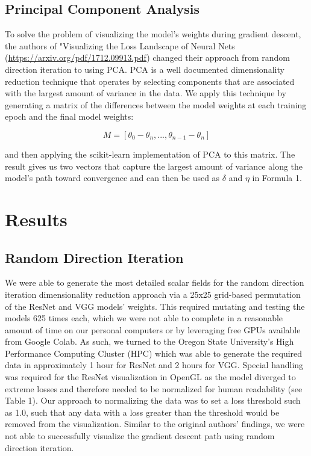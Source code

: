 \documentclass{acmsiggraph}
\begin{document}
\subsection{Principal Component Analysis}

To solve the problem of visualizing the model's weights during gradient descent, the authors of "Visualizing the Loss Landscape of Neural Nets (\url{https://arxiv.org/pdf/1712.09913.pdf}) changed their approach from random direction iteration to using PCA. PCA is a well documented dimensionality reduction technique that operates by selecting components that are associated with the largest amount of variance in the data. We apply this technique by generating a matrix of the differences between the model weights at each training epoch and the final model weights:

\begin{equation} \label{eq1}
M = [\theta_0 - \theta_n, . . ., \theta_{n-1} - \theta_n]
\end{equation}

and then applying the scikit-learn implementation of PCA to this matrix. The result gives us two vectors that capture the largest amount of variance along the model's path toward convergence and can then be used as $\delta$ and $\eta$ in Formula 1.

\section{Results}
\label{sec:intro}

\subsection{Random Direction Iteration}
We were able to generate the most detailed scalar fields for the random direction iteration dimensionality reduction approach via a 25x25 grid-based permutation of the ResNet and VGG models' weights. This required mutating and testing the models 625 times each, which we were not able to complete in a reasonable amount of time on our personal computers or by leveraging free GPUs available from Google Colab. As such, we turned to the Oregon State University's High Performance Computing Cluster (HPC) which was able to generate the required data in approximately 1 hour for ResNet and 2 hours for VGG. Special handling was required for the ResNet visualization in OpenGL as the model diverged to extreme losses and therefore needed to be normalized for human readability (see Table 1). Our approach to normalizing the data was to set a loss threshold such as 1.0, such that any data with a loss greater than the threshold would be removed from the visualization. Similar to the original authors' findings, we were not able to successfully visualize the gradient descent path using random direction iteration.
\end{document}

